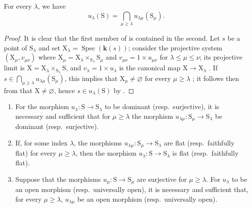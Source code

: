 \begin{corollary}[8.3.7]
\label{IV.8.3.7}
For every $\lambda$, we have
\begin{equation}
  u_\lambda(\mathrm{S})=\bigcap_{\mu\geqslant\lambda}u_{\lambda\mu}(\mathrm{S}_\mu).
  \tag{8.3.7.1}
\label{IV.8.3.7.1}
\end{equation}
\end{corollary}

\begin{proof}
It is clear that the first member of  is contained in the second.
Let $s$ be a point of $\mathrm{S}_\lambda$ and set $\mathrm{X}_\lambda=\operatorname{Spec}(\boldsymbol{k}(s))$; consider the projective system $(\mathrm{X}_\mu,v_{\mu\nu})$ where $\mathrm{X}_\mu=\mathrm{X}_\lambda\times_{\mathrm{S}_\lambda}\mathrm{S}_\mu$ and $v_{\mu\nu}=1\times u_{\mu\nu}$ for $\lambda\leqslant\mu\leqslant\nu$; its projective limit is $\mathrm{X}=\mathrm{X}_\lambda\times_{\mathrm{S}_\lambda}\mathrm{S}$, and $v_\lambda=1\times u_\lambda$ is the canonical map $\mathrm{X}\to\mathrm{X}_\lambda$ .
If $s\in\bigcap_{\mu\geqslant\lambda}u_{\lambda\mu}(\mathrm{S}_\mu)$, this implies that $\mathrm{X}_\mu\neq\varnothing$ for every $\mu\geqslant\lambda$ ; it follows then from  that $\mathrm{X}\neq\varnothing$, hence $s\in u_\lambda(\mathrm{S})$ by .
\end{proof}

\begin{proposition}[8.3.8]
\label{IV.8.3.8}
\begin{enumerate}[label=(\roman*)]
  \item For the morphism $u_\lambda:\mathrm{S}\to\mathrm{S}_\lambda$ to be dominant (resp.\ surjective), it is necessary and sufficient that for $\mu\geqslant\lambda$ the morphism $u_{\lambda\mu}:\mathrm{S}_\mu\to\mathrm{S}_\lambda$ be dominant (resp.\ surjective).
  \item If, for some index $\lambda$, the morphisms $u_{\lambda\mu}:\mathrm{S}_\mu\to\mathrm{S}_\lambda$ are flat (resp.\ faithfully flat) for every $\mu\geqslant\lambda$, then the morphism $u_\lambda:\mathrm{S}\to\mathrm{S}_\lambda$ is flat (resp.\ faithfully flat).
  \item Suppose that the morphisms $u_\mu:\mathrm{S}\to\mathrm{S}_\mu$ are surjective for $\mu\geqslant\lambda$.
For $u_\lambda$ to be an open morphism (resp.\ universally open), it is necessary and sufficient that, for every $\mu\geqslant\lambda$, $u_{\lambda\mu}$ be an open morphism (resp.\ universally open).
\end{enumerate}
\end{proposition}

